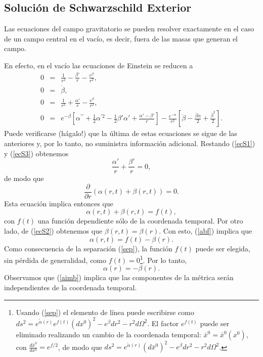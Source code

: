 \subsection{Solución de Schwarzschild Exterior}

Las ecuaciones del campo gravitatorio se pueden resolver exactamente en
el caso de un campo central en el vacío, es decir, fuera de las masas que
generan el campo.

En efecto, en el vacío las ecuaciones de Einstein se reducen a
\begin{eqnarray}
0&=& \frac{1}{r^2}-\frac{\beta'}{r}-\frac{e^\beta}{r^2}, \label{ecS1}\\
0&=& \dot{\beta}, \label{ecS2}\\
0&=& \frac{1}{r^2}+\frac{\alpha'}{r}-\frac{e^\beta}{r^2}, \label{ecS3}\\
0&=& e^{-\beta} \left[\alpha^{\prime\prime}+\frac{1}2\alpha^{\prime2}
-\frac{1}2\beta'\alpha'+\frac{ \alpha'-\beta'}{r}\right] -\frac{e^{-\alpha}}{c^2} \left[
\ddot{\beta}-\frac{\dot{\beta}\dot{\alpha}}2+\frac{\dot{\beta}^2}2\right].
\label{ecS4}
\end{eqnarray}
Puede verificarse (hágalo!) que la última de estas ecuaciones se sigue de las
anteriores y, por lo tanto, no suministra información adicional. Restando
(\ref{ecS1}) y (\ref{ecS3}) obtenemos
\begin{equation}
 \frac{\alpha'}{r}+\frac{\beta'}{r} =0,
\end{equation}
de modo que
\begin{equation}
\frac{\partial}{\partial r}\left( \alpha(r,t) +\beta(r,t) \right)
 =0.
\end{equation}
Esta ecuación implica entonces que
\begin{equation}
\alpha(r,t) +\beta(r,t) =f(t), \label{abf}
\end{equation}
con $f(t)$ una función dependiente sólo de la coordenada temporal. Por otro
lado, de (\ref{ecS2}) obtenemos que $\beta(r,t) =\beta(r)$. Con esto,
(\ref{abf}) implica que
\begin{equation}
\alpha(r,t) =f(t)-\beta(r). \label{sep}
\end{equation}
Como consecuencia de la separación (\ref{sep}), la función $f(t)$
puede ser elegida, sin pérdida de generalidad, como $f(t)=0$\footnote{Usando
(\ref{sep}) el elemento de línea puede escribirse como
$ds^2=e^{\tilde\alpha(r)}e^{f(t)}(dx^0)^2-e^\beta dr^2-r^2d\Omega^2$. El factor
$e^{f(t)}$ puede ser eliminado realizando un cambio de la coordenada
temporal: $\bar{x}^0=\bar{x}^0(x^0)$, con $\frac{d\bar{x}^0}{dx^0}=e^{f/2}$, de
modo que $ds^2=e^{\tilde\alpha(r)}(d\bar{x}^0)^2-e^\beta dr^2-r^2d\Omega^2$.}.
Por lo tanto,
\begin{equation}
 \alpha(r)=-\beta(r). \label{aimb}
\end{equation}
Observamos que (\ref{aimb}) implica que las componentes de la métrica serán
independientes de la coordenada temporal.

